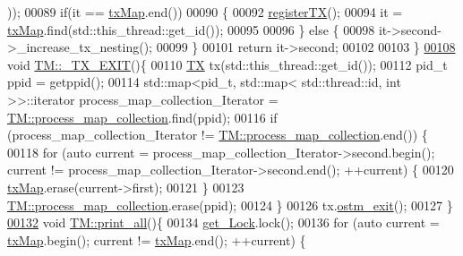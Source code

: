 \begin{DoxyCode}
      ));
00089     \textcolor{keywordflow}{if}(it == \hyperlink{class_t_m_a0333dfa193ea99d7626de74a2b932e9b_a0333dfa193ea99d7626de74a2b932e9b}{txMap}.end())
00090     \{
00092        \hyperlink{class_t_m_a26ea481c24d9aa3aebd6dafb7253376e_a26ea481c24d9aa3aebd6dafb7253376e}{registerTX}();
00094        it = \hyperlink{class_t_m_a0333dfa193ea99d7626de74a2b932e9b_a0333dfa193ea99d7626de74a2b932e9b}{txMap}.find(std::this\_thread::get\_id());
00095        
00096     \} \textcolor{keywordflow}{else} \{
00098         it->second->\_increase\_tx\_nesting();
00099     \}
00101     \textcolor{keywordflow}{return} it->second;
00102 
00103 \}
\hypertarget{_t_m_8cpp_source.tex_l00108}{}\hyperlink{class_t_m_a5e2d1127f2429f2f524d25f430eade06_a5e2d1127f2429f2f524d25f430eade06}{00108} \textcolor{keywordtype}{void} \hyperlink{class_t_m_a5e2d1127f2429f2f524d25f430eade06_a5e2d1127f2429f2f524d25f430eade06}{TM::\_TX\_EXIT}()\{
00110     \hyperlink{class_t_x}{TX} tx(std::this\_thread::get\_id());
00112     pid\_t ppid = getppid();
00114     std::map<pid\_t, std::map< std::thread::id, int >>::iterator process\_map\_collection\_Iterator = 
      \hyperlink{class_t_m_a6d417b18213968da2a70a914e80d639b_a6d417b18213968da2a70a914e80d639b}{TM::process\_map\_collection}.find(ppid);
00116     \textcolor{keywordflow}{if} (process\_map\_collection\_Iterator != \hyperlink{class_t_m_a6d417b18213968da2a70a914e80d639b_a6d417b18213968da2a70a914e80d639b}{TM::process\_map\_collection}.end()) \{
00118         \textcolor{keywordflow}{for} (\textcolor{keyword}{auto} current = process\_map\_collection\_Iterator->second.begin(); current != 
      process\_map\_collection\_Iterator->second.end(); ++current) \{
00120             \hyperlink{class_t_m_a0333dfa193ea99d7626de74a2b932e9b_a0333dfa193ea99d7626de74a2b932e9b}{txMap}.erase(current->first);
00121         \}
00123         \hyperlink{class_t_m_a6d417b18213968da2a70a914e80d639b_a6d417b18213968da2a70a914e80d639b}{TM::process\_map\_collection}.erase(ppid);
00124     \}
00126     tx.\hyperlink{class_t_x_aa9739c5c2077454c779098db7baefc2b_aa9739c5c2077454c779098db7baefc2b}{ostm\_exit}();
00127 \}
\hypertarget{_t_m_8cpp_source.tex_l00132}{}\hyperlink{class_t_m_a1d6891b1d3e71cc0acef54e7afe71c09_a1d6891b1d3e71cc0acef54e7afe71c09}{00132} \textcolor{keywordtype}{void} \hyperlink{class_t_m_a1d6891b1d3e71cc0acef54e7afe71c09_a1d6891b1d3e71cc0acef54e7afe71c09}{TM::print\_all}()\{
00134     \hyperlink{class_t_m_a123bc5aa0766a7b909bebc54a429e5b0_a123bc5aa0766a7b909bebc54a429e5b0}{get\_Lock}.lock();
00136     \textcolor{keywordflow}{for} (\textcolor{keyword}{auto} current = \hyperlink{class_t_m_a0333dfa193ea99d7626de74a2b932e9b_a0333dfa193ea99d7626de74a2b932e9b}{txMap}.begin(); current != \hyperlink{class_t_m_a0333dfa193ea99d7626de74a2b932e9b_a0333dfa193ea99d7626de74a2b932e9b}{txMap}.end(); ++current) \{

\end{DoxyCode}
